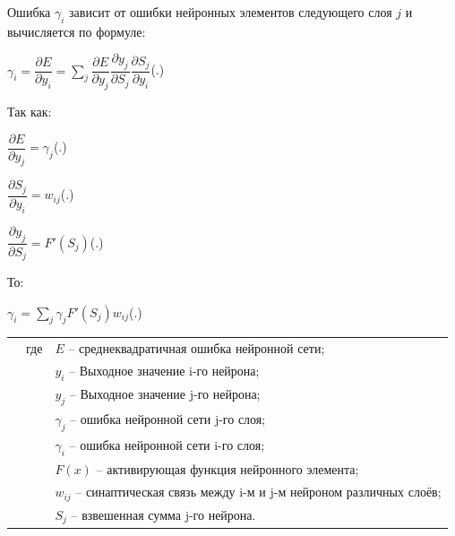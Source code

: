 {	\par \redline Ошибка $\gamma_{i}$ зависит от ошибки нейронных элементов следующего слоя $j$ и вычисляется по формуле:
	
	\formulaspace \par \redline 
	$\gamma_{i} =  \dfrac{\partial E}{\partial y_i} = \sum \limits _{j}^{} \dfrac{\partial E}{\partial y_j} \dfrac{\partial y_j}{\partial S_j} \dfrac{\partial S_j}{\partial y_i} $\hfill (\thechaptercntr .\theformulacntr) \redline
	\formulaspace \addtocounter{formulacntr}{1}
	
	\par \redline Так как:
	
	\formulaspace \par \redline 
	$ \dfrac{\partial E}{\partial y_j} = \gamma_{j} $\hfill (\thechaptercntr .\theformulacntr) \redline
	\formulaspace \addtocounter{formulacntr}{1}
	
	\formulaspace \par \redline 
	$ \dfrac{\partial S_j}{\partial y_i} = w_{ij}$\hfill (\thechaptercntr .\theformulacntr) \redline
	\formulaspace \addtocounter{formulacntr}{1}
	
	\formulaspace \par \redline 
	$ \dfrac{\partial y_j}{\partial S_j} = F'(S_{j})$\hfill (\thechaptercntr .\theformulacntr) \redline
	\formulaspace \addtocounter{formulacntr}{1}
	
	\par \redline То:
	
	\formulaspace \par \redline 
	$\gamma_{i} =  \sum \limits _{j}^{} \gamma_{j} F'(S_{j}) w_{ij}$\hfill (\thechaptercntr .\theformulacntr) \redline
	\formulaspace \addtocounter{formulacntr}{1}
	
	\begin{tabular}{p{}p{}p{}}
		& где  & $E$ {--} среднеквадратичная ошибка нейронной сети; \\
		&      & $y_{i}$ {--} Выходное значение i-го нейрона; \\
		&      & $y_{j}$ {--} Выходное значение j-го нейрона; \\
		&      & $\gamma_{j}$ {--} ошибка нейронной сети j-го слоя; \\
		&      & $\gamma_{i}$ {--} ошибка нейронной сети i-го слоя; \\
		&      & $F(x)$ {--} активирующая функция нейронного элемента; \\
		&      & $w_{ij}$ {--} синаптическая связь между i-м и j-м нейроном различных слоёв; \\
		&      & $S_{j}$ {--} взвешенная сумма j-го нейрона. \\
	\end{tabular}
	
}
